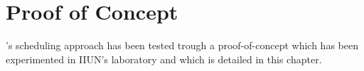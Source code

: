 
\chapter{Proof of Concept}
\label{chap:poc}

\GP{}'s scheduling approach has been tested trough a proof-of-concept which has been experimented in IIUN's laboratory and which is detailed in this chapter.



\newpage


